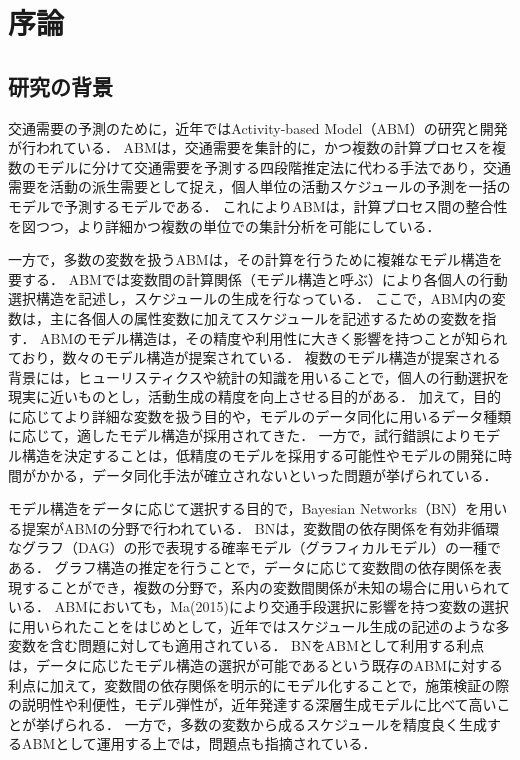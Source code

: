 \chapter{序論} 
\label{1}
\section{研究の背景}\label{1.1}
交通需要の予測のために，近年ではActivity-based Model（ABM）の研究と開発が行われている\cite{Nocedal&Wright}．
ABMは，交通需要を集計的に，かつ複数の計算プロセスを複数のモデルに分けて交通需要を予測する四段階推定法に代わる手法であり，交通需要を活動の派生需要として捉え，個人単位の活動スケジュールの予測を一括のモデルで予測するモデルである．
これによりABMは，計算プロセス間の整合性を図つつ，より詳細かつ複数の単位での集計分析を可能にしている．

一方で，多数の変数を扱うABMは，その計算を行うために複雑なモデル構造を要する．
ABMでは変数間の計算関係（モデル構造と呼ぶ）により各個人の行動選択構造を記述し，スケジュールの生成を行なっている．
ここで，ABM内の変数は，主に各個人の属性変数に加えてスケジュールを記述するための変数を指す．
ABMのモデル構造は，その精度や利用性に大きく影響を持つことが知られており，数々のモデル構造が提案されている．
複数のモデル構造が提案される背景には，ヒューリスティクスや統計の知識を用いることで，個人の行動選択を現実に近いものとし，活動生成の精度を向上させる目的がある．
加えて，目的に応じてより詳細な変数を扱う目的や，モデルのデータ同化に用いるデータ種類に応じて，適したモデル構造が採用されてきた．
一方で，試行錯誤によりモデル構造を決定することは，低精度のモデルを採用する可能性やモデルの開発に時間がかかる，データ同化手法が確立されないといった問題が挙げられている．

モデル構造をデータに応じて選択する目的で，Bayesian Networks（BN）を用いる提案がABMの分野で行われている．
BNは，変数間の依存関係を有効非循環なグラフ（DAG）の形で表現する確率モデル（グラフィカルモデル）の一種である．
グラフ構造の推定を行うことで，データに応じて変数間の依存関係を表現することができ，複数の分野で，系内の変数間関係が未知の場合に用いられている．
ABMにおいても，Ma(2015)により交通手段選択に影響を持つ変数の選択に用いられたことをはじめとして，近年ではスケジュール生成の記述のような多変数を含む問題に対しても適用されている．
BNをABMとして利用する利点は，データに応じたモデル構造の選択が可能であるという既存のABMに対する利点に加えて，変数間の依存関係を明示的にモデル化することで，施策検証の際の説明性や利便性，モデル弾性が，近年発達する深層生成モデルに比べて高いことが挙げられる．
一方で，多数の変数から成るスケジュールを精度良く生成するABMとして運用する上では，問題点も指摘されている．

